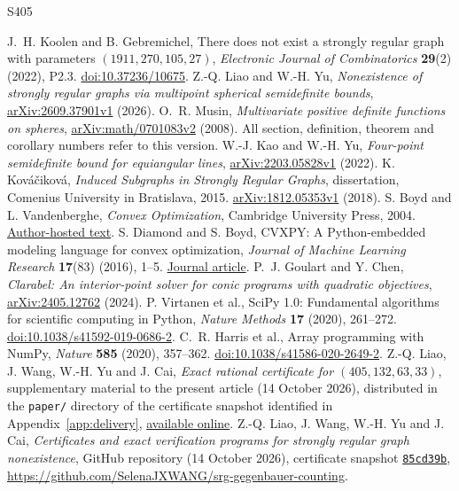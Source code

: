 \documentclass[11pt]{article}
\theoremstyle{remark}
\numberwithin{equation}{section}
\begin{document}
\begingroup\small
\begin{thebibliography}{S405}
\raggedright
{}
J.~H. Koolen and B. Gebremichel,
There does not exist a strongly regular graph with parameters
$(1911,270,105,27)$,
\emph{Electronic Journal of Combinatorics} \textbf{29}(2) (2022), P2.3.
\href{https://doi.org/10.37236/10675}{doi:10.37236/10675}.
Z.-Q. Liao and W.-H. Yu,
\emph{Nonexistence of strongly regular graphs via multipoint spherical
semidefinite bounds},
\href{https://arxiv.org/abs/2609.37901v1}{arXiv:2609.37901v1} (2026).
O.~R. Musin, \emph{Multivariate positive definite functions on spheres},
\href{https://arxiv.org/abs/math/0701083v2}{arXiv:math/0701083v2} (2008).
All section, definition, theorem and corollary numbers refer to this version.
W.-J. Kao and W.-H. Yu, \emph{Four-point semidefinite bound for equiangular
lines}, \href{https://arxiv.org/abs/2203.05828v1}{arXiv:2203.05828v1} (2022).
K. Kov\'a\v{c}ikov\'a, \emph{Induced Subgraphs in Strongly Regular Graphs},
dissertation, Comenius University in Bratislava, 2015.
\href{https://arxiv.org/abs/1812.05353v1}{arXiv:1812.05353v1} (2018).
S. Boyd and L. Vandenberghe, \emph{Convex Optimization},
Cambridge University Press, 2004.
\href{https://web.stanford.edu/~boyd/cvxbook/}{Author-hosted text}.
S. Diamond and S. Boyd,
CVXPY: A Python-embedded modeling language for convex optimization,
\emph{Journal of Machine Learning Research} \textbf{17}(83) (2016), 1--5.
\href{https://jmlr.org/papers/v17/15-408.html}{Journal article}.
P.~J. Goulart and Y. Chen,
\emph{Clarabel: An interior-point solver for conic programs with quadratic
objectives}, \href{https://arxiv.org/abs/2405.12762}{arXiv:2405.12762} (2024).
P. Virtanen et al.,
SciPy 1.0: Fundamental algorithms for scientific computing in Python,
\emph{Nature Methods} \textbf{17} (2020), 261--272.
\href{https://doi.org/10.1038/s41592-019-0686-2}{doi:10.1038/s41592-019-0686-2}.
C.~R. Harris et al., Array programming with NumPy,
\emph{Nature} \textbf{585} (2020), 357--362.
\href{https://doi.org/10.1038/s41586-020-2649-2}{doi:10.1038/s41586-020-2649-2}.
Z.-Q. Liao, J. Wang, W.-H. Yu and J. Cai,
\emph{Exact rational certificate for $(405,132,63,33)$},
supplementary material to the present article (14 October 2026),
distributed in the \texttt{paper/} directory of the certificate snapshot
identified in Appendix~\ref{app:delivery},
\href{https://github.com/SelenaJXWANG/srg-gegenbauer-counting/tree/main/paper}{available online}.
Z.-Q. Liao, J. Wang, W.-H. Yu and J. Cai,
\emph{Certificates and exact verification programs for strongly regular graph nonexistence},
GitHub repository (14 October 2026), certificate snapshot
\href{https://github.com/SelenaJXWANG/srg-gegenbauer-counting/tree/85cd39b74c9ef8a61ab746deb1102af3eeae7e10}{\texttt{85cd39b}},
\url{https://github.com/SelenaJXWANG/srg-gegenbauer-counting}.
\end{thebibliography}
\endgroup
\end{document}
